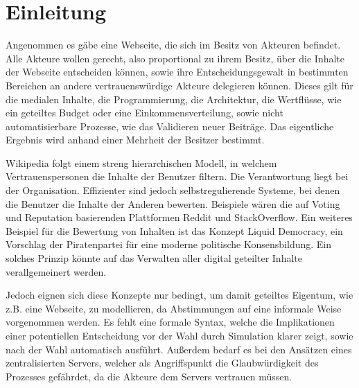 \documentclass[a4paper,12pt]{report}
\begin{document}



% 


\newpage
\tableofcontents
\newpage
\thispagestyle{empty}
\mbox{}





\newpage
\setcounter{page}{1} 
\chapter{Einleitung}

Angenommen es gäbe eine Webseite, die sich im Besitz von Akteuren befindet. Alle Akteure wollen gerecht, also proportional zu ihrem Besitz, über die Inhalte der Webseite entscheiden können, sowie ihre Entscheidungsgewalt in bestimmten Bereichen an andere vertrauenswürdige Akteure delegieren können. Dieses gilt für die medialen Inhalte, die Programmierung, die Architektur, die Wertflüsse, wie ein geteiltes Budget oder eine Einkommensverteilung, sowie nicht automatisierbare Prozesse, wie das Validieren neuer Beiträge. Das eigentliche Ergebnis wird anhand einer Mehrheit der Besitzer bestimmt.

Wikipedia folgt einem streng hierarchischen Modell, in welchem Vertrauenspersonen die Inhalte der Benutzer filtern. Die Verantwortung liegt bei der Organisation.
Effizienter sind jedoch selbstregulierende Systeme, bei denen die Benutzer die Inhalte der Anderen bewerten. Beispiele wären die auf Voting und Reputation basierenden Plattformen Reddit und StackOverflow.
Ein weiteres Beispiel für die Bewertung von Inhalten ist das Konzept 
Liquid Democracy\cite{Lindenberg2010}, ein Vorschlag der Piratenpartei für eine moderne politische Konsensbildung.
Ein solches Prinzip könnte auf das Verwalten aller digital geteilter Inhalte verallgemeinert werden.

Jedoch eignen sich diese Konzepte nur bedingt, um damit geteiltes Eigentum, wie z.B. eine Webseite, zu modellieren, da Abstimmungen auf eine informale Weise vorgenommen werden. Es fehlt eine formale Syntax, welche die Implikationen einer potentiellen Entscheidung vor der Wahl durch Simulation klarer zeigt, sowie nach der Wahl automatisch ausführt.
Außerdem bedarf es bei den Ansätzen eines zentralisierten Servers, welcher als Angriffspunkt die Glaubwürdigkeit des Prozesses gefährdet, da die Akteure dem Servers vertrauen müssen. 
\end{document}
